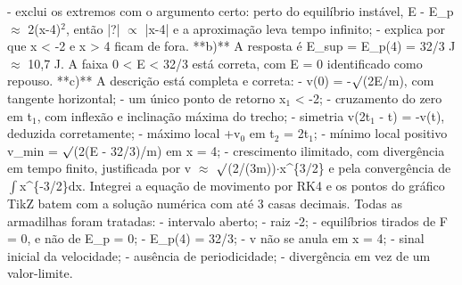 \documentclass{article}%
\begin{document}
{-} exclui os extremos com o argumento certo: perto do equilíbrio instável, E - E\_p $\approx$ 2(x-4)$^2$, então |?| $\propto$ |x-4| e a aproximação leva tempo infinito;\newline%
{-} explica por que x < -2 e x > 4 ficam de fora.\newline%
\newline%
**b)** A resposta é E\_sup = E\_p(4) = 32/3 J $\approx$ 10,7 J. A faixa 0 < E < 32/3 está correta, com E = 0 identificado como repouso.\newline%
\newline%
**c)** A descrição está completa e correta:\newline%
{-} v(0) = -$\surd$(2E/m), com tangente horizontal;\newline%
{-} um único ponto de retorno x$_{1}$ < -2;\newline%
{-} cruzamento do zero em t$_{1}$, com inflexão e inclinação máxima do trecho;\newline%
{-} simetria v(2t$_{1}$ - t) = -v(t), deduzida corretamente;\newline%
{-} máximo local +v$_{0}$ em t$_{2}$ = 2t$_{1}$;\newline%
{-} mínimo local positivo v\_min = $\surd$(2(E - 32/3)/m) em x = 4;\newline%
{-} crescimento ilimitado, com divergência em tempo finito, justificada por v $\approx$ $\surd$(2/(3m))$\cdot$x\^{}\{3/2\} e pela convergência de $\int$x\^{}\{{-}3/2\}dx.\newline%
\newline%
Integrei a equação de movimento por RK4 e os pontos do gráfico TikZ batem com a solução numérica com até 3 casas decimais.\newline%
\newline%
Todas as armadilhas foram tratadas:\newline%
{-} intervalo aberto;\newline%
{-} raiz -2;\newline%
{-} equilíbrios tirados de F = 0, e não de E\_p = 0;\newline%
{-} E\_p(4) = 32/3;\newline%
{-} v não se anula em x = 4;\newline%
{-} sinal inicial da velocidade;\newline%
{-} ausência de periodicidade;\newline%
{-} divergência em vez de um valor{-}limite.\newline%
\newline%
\end{document}

